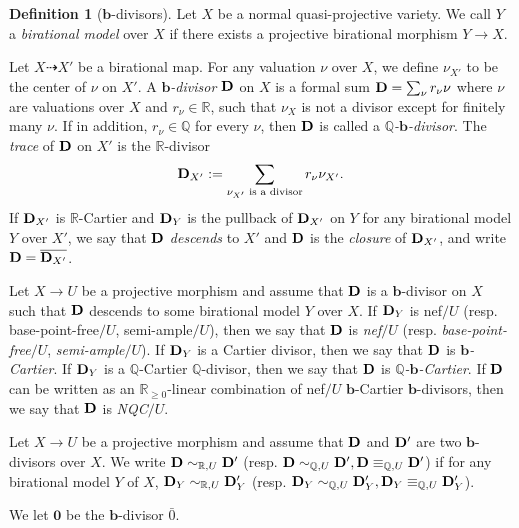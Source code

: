 \documentclass[11pt]{amsart}
\numberwithin{equation}{section}
\newcommand{\bb}{\bm{b}}
\newcommand{\Dd}{{\bf{D}}}
\newcommand{\Qq}{\mathbb{Q}}
\newcommand{\Rr}{\mathbb{R}}
\theoremstyle{definition}
\newtheorem{defn}[thm]{Definition}
\theoremstyle{definition}
\theoremstyle{definition}
\begin{document}
\begin{defn}[$\bb$-divisors]\label{defn: b divisors} Let $X$ be a normal quasi-projective variety. We call $Y$ a \emph{birational model} over $X$ if there exists a projective birational morphism $Y\to X$. 

Let $X\dashrightarrow X'$ be a birational map. For any valuation $\nu$ over $X$, we define $\nu_{X'}$ to be the center of $\nu$ on $X'$. A \emph{$\bb$-divisor} $\Dd$ on $X$ is a formal sum $\Dd=\sum_{\nu} r_{\nu}\nu$ where $\nu$ are valuations over $X$ and $r_{\nu}\in\mathbb R$, such that $\nu_X$ is not a divisor except for finitely many $\nu$. If in addition, $r_{\nu}\in\Qq$ for every $\nu$, then $\Dd$ is called a \emph{$\Qq$-$\bb$-divisor}. The \emph{trace} of $\Dd$ on $X'$ is the $\Rr$-divisor
$$\Dd_{X'}:=\sum_{\nu_{X'}\text{ is a divisor}}r_\nu\nu_{X'}.$$
If $\Dd_{X'}$ is $\Rr$-Cartier and $\Dd_{Y}$ is the pullback of $\Dd_{X'}$ on $Y$ for any birational model $Y$ over $X'$, we say that $\Dd$ \emph{descends} to $X'$ and $\Dd$ is the \emph{closure} of $\Dd_{X'}$, and write $\Dd=\overline{\Dd_{X'}}$. 

Let $X\rightarrow U$ be a projective morphism and assume that $\Dd$ is a $\bb$-divisor on $X$ such that $\Dd$ descends to some birational model $Y$ over $X$. If $\Dd_Y$ is nef$/U$ (resp. base-point-free$/U$, semi-ample$/U$), then we say that $\Dd$ is \emph{nef}$/U$ (resp. \emph{base-point-free}$/U$, \emph{semi-ample}$/U$). If $\Dd_Y$ is a Cartier divisor, then we say that $\Dd$ is \emph{$\bb$-Cartier}. If $\Dd_Y$ is a $\Qq$-Cartier $\Qq$-divisor, then we say that $\Dd$ is \emph{$\Qq$-$\bb$-Cartier}. If $\Dd$ can be written as an $\Rr_{\geq 0}$-linear combination of nef$/U$ $\bb$-Cartier $\bb$-divisors, then we say that $\Dd$ is \emph{NQC}$/U$.

Let $X\rightarrow U$ be a projective morphism and assume that $\Dd$ and $\Dd'$ are two $\bb$-divisors over $X$. We write $\Dd\sim_{\mathbb R,U}\Dd'$ (resp. $\Dd\sim_{\mathbb Q,U}\Dd',\Dd\equiv_{\mathbb Q,U}\Dd'$) if for any birational model $Y$ of $X$, $\Dd_Y\sim_{\mathbb R,U}\Dd'_Y$ (resp. $\Dd_Y\sim_{\mathbb Q,U}\Dd'_Y,\Dd_Y\equiv_{\mathbb Q,U}\Dd_Y'$). 

We let $\bm{0}$ be the $\bb$-divisor $\bar{0}$.
\end{defn}
\end{document}
